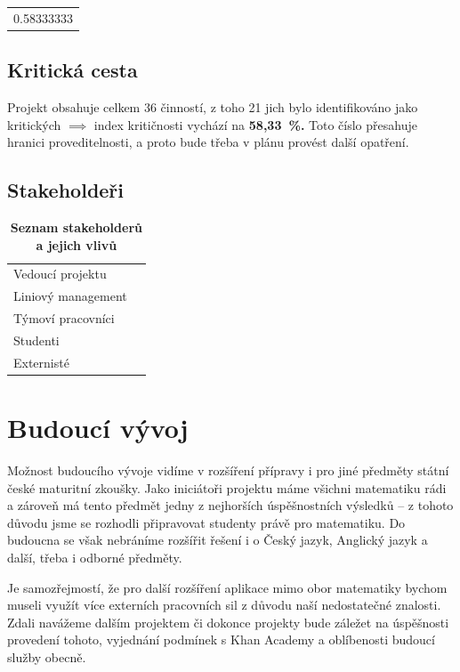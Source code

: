 \documentclass[12pt, a4paper]{report}
\begin{document}
\begin{center}
\begin{tabular}{r}
0.58333333\\
\end{tabular}
\end{center}

\section{Kritická cesta}
\label{sec:org5e23070}
Projekt obsahuje celkem 36 činností, z toho 21 jich bylo identifi\-kováno jako kritických \(\implies\) index kritičnosti vychází na \textbf{58,33 \%.} Toto číslo přesahuje hranici proveditelnosti, a proto bude třeba v plánu provést další opatření.

\section{Stakeholdeři}
\label{sec:orge5816cf}
\begin{table}[htbp]
\caption{\textbf{Seznam stakeholderů a jejich vlivů}}
\centering
\footnotesize
\begin{tabularx}{\textwidth}{lX}
Vedoucí projektu & \\
Liniový management & \\
Týmoví pracovníci & \\
Studenti & \\
Externisté & \\
\end{tabularx}
\end{table}


\chapter{Budoucí vývoj}
\label{sec:org2ad0c11}
Možnost budoucího vývoje vidíme v rozšíření přípravy i pro jiné předměty státní české maturitní zkoušky. Jako iniciátoři projektu máme všichni matematiku rádi a zároveň má tento předmět jedny z nejhorších úspěšnostních výsledků -- z tohoto důvodu jsme se rozhodli připravovat studenty právě pro matematiku. Do budoucna se však nebráníme rozšířit řešení i o Český jazyk, Anglický jazyk a další, třeba i odborné předměty.

Je samozřejmostí, že pro další rozšíření aplikace mimo obor matematiky bychom museli využít více externích pracovních sil z důvodu naší nedostatečné znalosti. Zdali navážeme dalším projektem či dokonce projekty bude záležet na úspěšnosti provedení tohoto, vyjednání podmínek s Khan Academy a oblíbenosti budoucí služby obecně.
\end{document}
